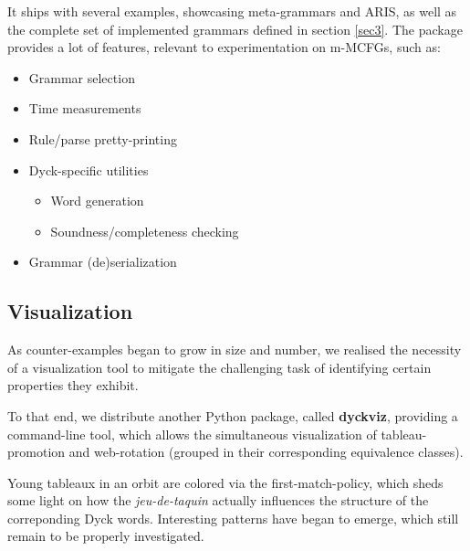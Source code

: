 \documentclass[nonatbib,numbers,10pt]{llncs}
\begin{document}
It ships with several examples, showcasing meta-grammars and \textsc{ARIS}, as well as the complete set of implemented grammars defined in section \ref{sec3}. The package provides a lot of features, relevant to experimentation on m-MCFGs, such as:
\begin{itemize}
\item Grammar selection
\item Time measurements
\item Rule/parse pretty-printing
\item Dyck-specific utilities
	\begin{itemize}
	\item Word generation
	\item Soundness/completeness checking
	\end{itemize}
\item Grammar (de)serialization
\end{itemize}

\subsection{Visualization}
As counter-examples began to grow in size and number, we realised the necessity of a visualization tool to mitigate the challenging task of identifying certain properties they exhibit.

To that end, we distribute another Python package, called \textbf{dyckviz}, providing a command-line tool, which allows the simultaneous visualization of tableau-promotion and web-rotation (grouped in their corresponding equivalence classes).

Young tableaux in an orbit are colored via the first-match-policy, which sheds some light on how the \textit{jeu-de-taquin} actually influences the structure of the correponding Dyck words. Interesting patterns have began to emerge, which still remain to be properly investigated.
\end{document}
